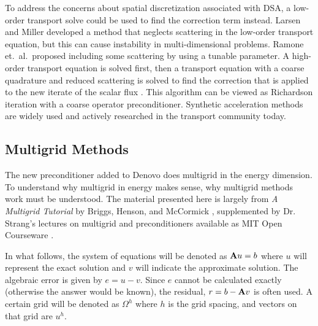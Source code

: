 To address the concerns about spatial discretization associated with DSA, a low-order transport solve could be used to find the correction term instead. Larsen and Miller developed a method that neglects scattering in the low-order transport equation, but this can cause instability in multi-dimensional problems. Ramone et.\ al.\ proposed including some scattering by using a tunable parameter. A high-order transport equation is solved first, then a transport equation with a coarse quadrature and reduced scattering is solved to find the correction that is applied to the new iterate of the scalar flux \cite{Ramone1997}. This algorithm can be viewed as Richardson iteration with a coarse operator preconditioner. Synthetic acceleration methods are widely used and actively researched in the transport community today.

\subsection{Multigrid Methods}
The new preconditioner added to Denovo does multigrid in the energy dimension. To understand why multigrid in energy makes sense, why multigrid methods work must be understood. The material presented here is largely from \emph{A Multigrid Tutorial} by Briggs, Henson, and McCormick \cite{Briggs2000}, supplemented by Dr. Strang's lectures on multigrid and preconditioners available as MIT Open Courseware \cite{Strang}.

In what follows, the system of equations will be denoted as $\mathbf{A}u=b$ where $u$ will represent the exact solution and $v$ will indicate the approximate solution. The algebraic error is given by $e = u - v$. Since $e$ cannot be calculated exactly (otherwise the answer would be known), the residual, $r = b - \mathbf{A}v$ is often used. A certain grid will be denoted as $\Omega^{h}$ where $h$ is the grid spacing, and vectors on that grid are $u^{h}$. 

